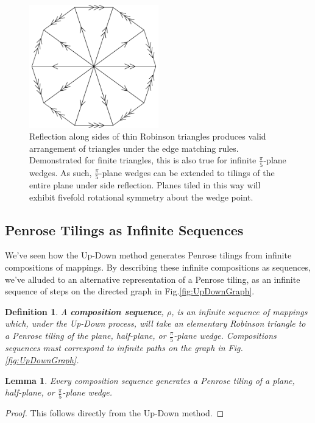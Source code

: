 \documentclass[
  oneside,
  11pt, a4paper,
  footinclude=true,
  headinclude=true,
  cleardoublepage=empty
]{scrbook}
\newtheorem{mydef}{Definition}
\newtheorem{mylem}{Lemma}
\begin{document}
\begin{figure}
\centering
\includegraphics[width=0.5\textwidth]{WedgeWheel}
\caption{Reflection along sides of thin Robinson triangles produces valid arrangement of triangles under the edge matching rules. Demonstrated for finite triangles, this is also true for infinite  $\frac{\pi}{5}$-plane wedges. As such,  $\frac{\pi}{5}$-plane wedges can be extended to tilings of the entire plane under side reflection. Planes tiled in this way will exhibit fivefold rotational symmetry about the wedge point.}
\label{fig:WedgeWheel}
\end{figure}

\subsection{Penrose Tilings as Infinite Sequences}
We've seen how the Up-Down method generates Penrose tilings from infinite compositions of mappings. By describing these infinite compositions as sequences, we've alluded to an alternative representation of a Penrose tiling, as an infinite sequence of steps on the directed graph in Fig.\ref{fig:UpDownGraph}. 

\begin{mydef}
A \textbf{composition sequence}, $\rho$, is an infinite sequence of mappings which, under the Up-Down process, will take an elementary Robinson triangle to a Penrose tiling of the plane, half-plane, or $\frac{\pi}{5}$-plane wedge. Compositions sequences must correspond to infinite paths on the graph in Fig.\ref{fig:UpDownGraph}.
\end{mydef}

\begin{mylem}
Every composition sequence generates a Penrose tiling of a plane, half-plane, or $\frac{\pi}{5}$-plane wedge.
\end{mylem}

\begin{proof}
This follows directly from the Up-Down method.
\end{proof}
\end{document}
